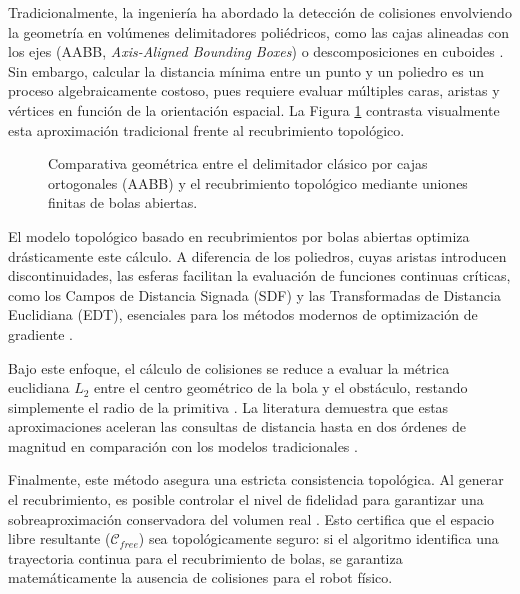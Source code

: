 Tradicionalmente, la ingeniería ha abordado la detección de colisiones 
envolviendo la geometría en volúmenes delimitadores poliédricos, 
como las cajas alineadas con los ejes 
(AABB, \textit{Axis-Aligned Bounding Boxes}) o descomposiciones en 
cuboides \parencite{coumar2025foam}. Sin embargo, calcular 
la distancia mínima entre un punto y un poliedro es un proceso 
algebraicamente costoso, pues requiere evaluar múltiples caras, aristas y 
vértices en función de la orientación espacial. La Figura \ref{fig:bolas_vs_aabb} 
contrasta visualmente esta aproximación tradicional frente al recubrimiento topológico.

\begin{figure}[htbp]
    \centering
    
    \caption{Comparativa geométrica entre el delimitador clásico por cajas ortogonales (AABB) y el recubrimiento topológico mediante uniones finitas de bolas abiertas.}
    \label{fig:bolas_vs_aabb}
\end{figure}

El modelo topológico basado en recubrimientos por bolas abiertas 
optimiza drásticamente este cálculo. A diferencia de los poliedros, 
cuyas aristas introducen discontinuidades, las esferas facilitan la 
evaluación de funciones continuas críticas, como los Campos de 
Distancia Signada (SDF) y las Transformadas de Distancia Euclidiana 
(EDT), esenciales para los métodos modernos de optimización de 
gradiente \parencite{coumar2025foam}. 

Bajo este enfoque, el cálculo de colisiones se reduce a evaluar la 
métrica euclidiana $L_2$ entre el centro geométrico de la bola y el 
obstáculo, restando simplemente el radio de la primitiva 
\parencite{coumar2025foam}. La literatura demuestra que estas 
aproximaciones aceleran las consultas de distancia hasta en dos 
órdenes de magnitud en comparación con los modelos tradicionales 
\parencite{coumar2025foam}. 

Finalmente, este método asegura una estricta consistencia topológica. 
Al generar el recubrimiento, es posible controlar el nivel de fidelidad 
para garantizar una sobreaproximación conservadora del volumen real 
\parencite{coumar2025foam}. Esto certifica que el espacio libre 
resultante ($\mathcal{C}_{free}$) sea topológicamente seguro: 
si el algoritmo identifica una trayectoria continua para el 
recubrimiento de bolas, se garantiza matemáticamente la ausencia 
de colisiones para el robot físico.



